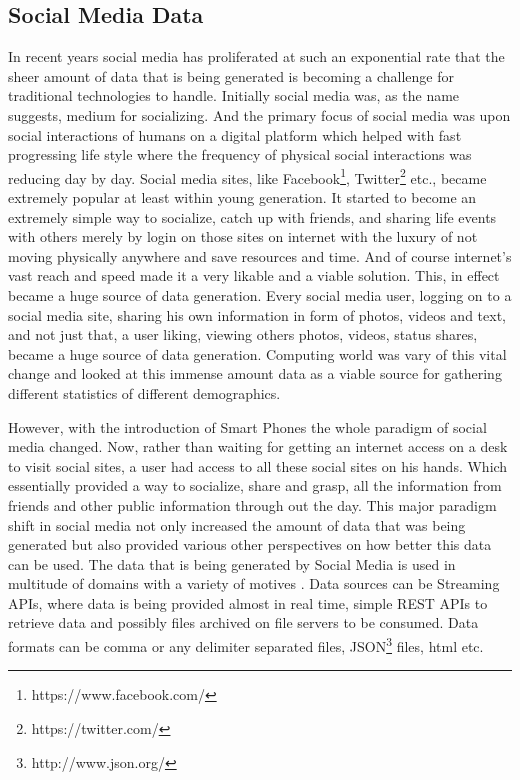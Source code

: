\documentclass[sigconf]{acmart}
\begin{document}
\subsection{Social Media Data}

In recent years social media has proliferated at such an exponential rate that the sheer amount of data that is being generated is becoming a challenge for traditional technologies to handle. Initially social media was, as the name suggests, medium for socializing. And the primary focus of social media was upon social interactions of humans on a digital platform which helped with fast progressing life style where the frequency of physical social interactions was reducing day by day. Social media sites, like Facebook\footnote{https://www.facebook.com/}, Twitter\footnote{https://twitter.com/} etc., became extremely popular at least within young generation. It started to become an extremely simple way to socialize, catch up with friends, and sharing life events with others merely by login on those sites on internet with the luxury of not moving physically anywhere and save resources and time. And of course internet's vast reach and speed made it a very likable and a viable solution. This, in effect became a huge source of data generation. Every social media user, logging on to a social media site, sharing his own information in form of photos, videos and text, and not just that, a user liking, viewing others photos, videos, status shares, became a huge source of data generation\cite{fbstats}. Computing world was vary of this vital change and looked at this immense amount data as a viable source for gathering different statistics of different demographics\cite{bogdanphilip}.

However, with the introduction of Smart Phones the whole paradigm of social media changed\cite{CIER}. Now, rather than waiting for getting an internet access on a desk to visit social sites, a user had access to all these social sites on his hands. Which essentially provided a way to socialize, share and grasp, all the information from friends and other public information through out the day\cite{amandaphones}. This major paradigm shift in social media not only increased the amount of data that was being generated but also provided various other perspectives on how better this data can be used. The data that is being generated by Social Media is used in multitude of domains with a variety of motives \cite{ncsupost}. Data sources can be Streaming APIs, where data is being provided almost in real time, simple REST APIs to retrieve data and possibly files archived on file servers to be consumed. Data formats can be comma or any delimiter separated files, JSON\footnote{http://www.json.org/} files, html etc.
\end{document}
